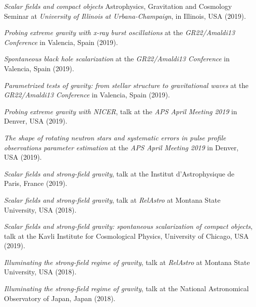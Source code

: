 \documentclass[10pt]{article}
\newcommand{\invited}{{\color{aeilbl}{invited}}}
\begin{document}
\begin{bibenum}
    \item
    \emph{Scalar fields and compact objects}
    Astrophysics, Gravitation and Cosmology Seminar at \emph{University of Illinois at Urbana-Champaign},
    in Illinois, USA (2019).

    \item
    \emph{Probing extreme gravity with x-ray burst oscillations}
    at the \emph{GR22/Amaldi13 Conference}
    in Valencia, Spain (2019).

    \item
    \emph{Spontaneous black hole scalarization}
    at the \emph{GR22/Amaldi13 Conference}
    in Valencia, Spain (2019).

    \item
    \emph{Parametrized tests of gravity: from stellar structure to gravitational waves}
    at the \emph{GR22/Amaldi13 Conference}
    in Valencia, Spain (2019).

    \item
    \emph{Probing extreme gravity with NICER},
    \invited{} talk at the \emph{APS April Meeting 2019}
    in Denver, USA (2019).

    \item
    \emph{The shape of rotating neutron stars and systematic errors
          in pulse profile observations parameter estimation}
    at the \emph{APS April Meeting 2019}
    in Denver, USA (2019).

    \item
    \emph{Scalar fields and strong-field gravity},
    \invited{} talk at the Institut d'Astrophysique de Paris, France (2019).

    \item
    \emph{Scalar fields and strong-field gravity},
    talk at \emph{RelAstro} at Montana State University, USA (2018).

	\item
    \emph{Scalar fields and strong-field gravity: spontaneous scalarization of compact objects},
    \invited{} talk at the Kavli Institute for Cosmological Physics, University of Chicago, USA (2019).

    \item
    \emph{Illuminating the strong-field regime of gravity},
    talk at \emph{RelAstro} at Montana State University, USA (2018).

	\item
    \emph{Illuminating the strong-field regime of gravity},
    \invited{} talk at the National Astronomical Observatory of Japan, Japan (2018).


\end{bibenum}
\end{document}
